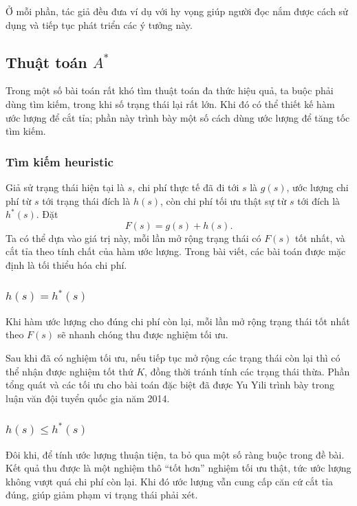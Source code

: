 \documentclass[11pt]{article}
\begin{document}
Ở mỗi phần, tác giả đều đưa ví dụ với hy vọng giúp người đọc nắm được cách sử
dụng và tiếp tục phát triển các ý tưởng này.

\subsection{\texorpdfstring{Thuật toán \(A^*\)}{Thuật toán A*}}

Trong một số bài toán rất khó tìm thuật toán đa thức hiệu quả, ta buộc phải
dùng tìm kiếm, trong khi số trạng thái lại rất lớn. Khi đó có thể thiết kế hàm
ước lượng để cắt tỉa; phần này trình bày một số cách dùng ước lượng để tăng tốc
tìm kiếm.

\subsubsection{Tìm kiếm heuristic}

Giả sử trạng thái hiện tại là \(s\), chi phí thực tế đã đi tới \(s\) là
\(g(s)\), ước lượng chi phí từ \(s\) tới trạng thái đích là \(h(s)\), còn chi
phí tối ưu thật sự từ \(s\) tới đích là \(h^*(s)\). Đặt
\[
  F(s)=g(s)+h(s).
\]
Ta có thể dựa vào giá trị này, mỗi lần mở rộng trạng thái có \(F(s)\) tốt nhất,
và cắt tỉa theo tính chất của hàm ước lượng. Trong bài viết, các bài toán được
mặc định là tối thiểu hóa chi phí.

\subsubsection{\texorpdfstring{\(h(s)=h^*(s)\)}{h(s)=h*(s)}}

Khi hàm ước lượng cho đúng chi phí còn lại, mỗi lần mở rộng trạng thái tốt nhất
theo \(F(s)\) sẽ nhanh chóng thu được nghiệm tối ưu.

Sau khi đã có nghiệm tối ưu, nếu tiếp tục mở rộng các trạng thái còn lại thì có
thể nhận được nghiệm tốt thứ \(K\), đồng thời tránh tính các trạng thái thừa.
Phần tổng quát và các tối ưu cho bài toán đặc biệt đã được Yu Yili trình bày
trong luận văn đội tuyển quốc gia năm 2014.

\subsubsection{\texorpdfstring{\(h(s)\le h^*(s)\)}{h(s)<=h*(s)}}

Đôi khi, để tính ước lượng thuận tiện, ta bỏ qua một số ràng buộc trong đề bài.
Kết quả thu được là một nghiệm thô ``tốt hơn'' nghiệm tối ưu thật, tức ước lượng
không vượt quá chi phí còn lại. Khi đó ước lượng vẫn cung cấp căn cứ cắt tỉa
đúng, giúp giảm phạm vi trạng thái phải xét.
\end{document}
